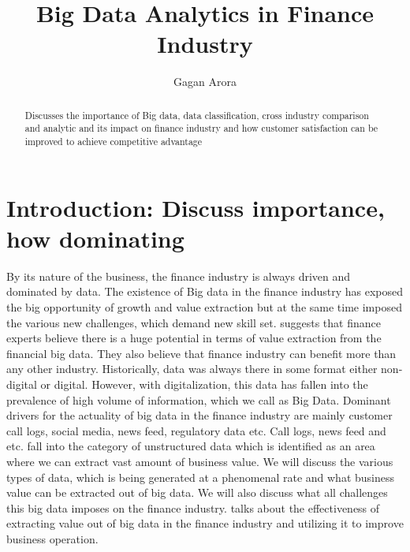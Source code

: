 \documentclass[sigconf]{acmart}
\begin{document}
\title{Big Data Analytics in Finance Industry}


\author{Gagan Arora}


\renewcommand{\shortauthors}{B. Trovato et al.}


\begin{abstract}
Discusses the importance of Big data, data classification, cross industry comparison and analytic and its impact on finance industry and how customer satisfaction can be improved to achieve competitive advantage 
\end{abstract}



\maketitle

\section{Introduction: Discuss importance, how dominating }

By its nature of the business, the finance industry is always driven and dominated by data. The existence of Big data in the finance industry has exposed the big opportunity of growth and value extraction but at the same time imposed the various new challenges, which demand new skill set. \cite{Ref3} suggests that finance experts believe there is a huge potential in terms of value extraction from the financial big data. They also believe that finance industry can benefit more than any other industry.  Historically, data was always there in some format either non-digital or digital. However, with digitalization, this data has fallen into the prevalence of high volume of information, which we call as Big Data. Dominant drivers for the actuality of big data in the finance industry are mainly customer call logs, social media, news feed, regulatory data etc. Call logs, news feed and etc. fall into the category of unstructured data which is identified as an area where we can extract vast amount of business value. We will discuss the various types of data, which is being generated at a phenomenal rate and what business value can be extracted out of big data. We will also discuss what all challenges this big data imposes on the finance industry. \cite{Ref1} talks about the effectiveness of extracting value out of big data in the finance industry and utilizing it to improve business operation. 
\end{document}
